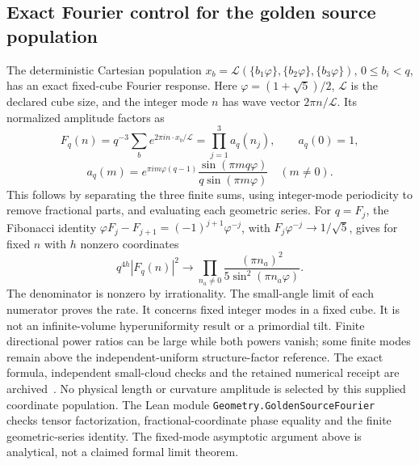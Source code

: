 \documentclass[11pt]{article}
\theoremstyle{remark}
\begin{document}
\subsection{Exact Fourier control for the golden source population}
The deterministic Cartesian population
\(x_b=\mathcal L(\{b_1\varphi\},\{b_2\varphi\},\{b_3\varphi\})\),
\(0\le b_i<q\), has an exact fixed-cube Fourier response. Here
\(\varphi=(1+\sqrt5)/2\), \(\mathcal L\) is the declared cube size,
and the integer mode \(n\) has wave vector \(2\pi n/\mathcal L\).
Its normalized amplitude factors as
\[
 F_q(n)=q^{-3}\sum_b e^{2\pi i n\cdot x_b/\mathcal L}
       =\prod_{j=1}^3 a_q(n_j),\qquad a_q(0)=1,
\]
\[
 a_q(m)=e^{\pi i m\varphi(q-1)}
       \frac{\sin(\pi mq\varphi)}{q\sin(\pi m\varphi)}
       \quad(m\ne0).
\]
This follows by separating the three finite sums, using integer-mode
periodicity to remove fractional parts, and evaluating each geometric
series. For \(q=F_j\), the Fibonacci identity
\(\varphi F_j-F_{j+1}=(-1)^{j+1}\varphi^{-j}\), with
\(F_j\varphi^{-j}\to1/\sqrt5\), gives for fixed \(n\)
with \(h\) nonzero coordinates
\[
 q^{4h}|F_q(n)|^2\longrightarrow
 \prod_{n_a\ne0}\frac{(\pi n_a)^2}{5\sin^2(\pi n_a\varphi)}.
\]
The denominator is nonzero by irrationality. The small-angle limit of
each numerator proves the rate. It concerns fixed integer modes in a
fixed cube. It is not an infinite-volume hyperuniformity result or a
primordial tilt. Finite directional power ratios can be large while both
powers vanish; some finite modes remain above the independent-uniform
structure-factor reference. The exact formula, independent small-cloud
checks and the retained numerical receipt are
archived~\cite{ophgoldenfourier}. No physical length or curvature
amplitude is selected by this supplied coordinate population. The Lean
module \texttt{Geometry.GoldenSourceFourier}~\cite{ophlean} checks tensor
factorization, fractional-coordinate phase equality and the finite
geometric-series identity. The fixed-mode asymptotic argument above is
analytical, not a claimed formal limit theorem.
\end{document}
